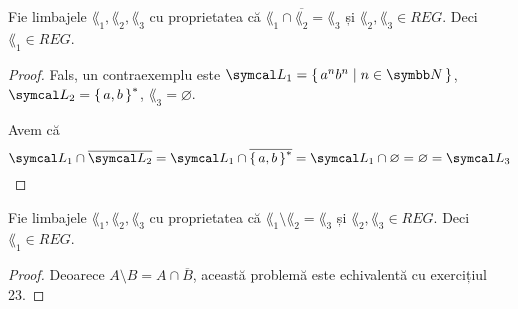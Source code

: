 \begin{exercise}
    Fie limbajele \(\lang_1, \lang_2, \lang_3\) cu proprietatea că \(\lang_1 \cap \overline{\lang_2} = \lang_3\) și \(\lang_2, \lang_3 \in REG\). Deci \(\lang_1 \in REG\).
\end{exercise}
\begin{proof}
    Fals, un contraexemplu este \(\lang_1 = \set{ a^n b^n | n \in \naturals }\), \(\lang_2 = \set{a, b}^*\), \(\lang_3 = \varnothing\).

    Avem că
    \[\lang_1 \cap \overline{\lang_2} = \lang_1 \cap \overline{\set{ a, b }^* } = \lang_1 \cap \varnothing = \varnothing = \lang_3\]
\end{proof}

\begin{exercise}
    Fie limbajele \(\lang_1, \lang_2, \lang_3\) cu proprietatea că \(\lang_1 \setminus \lang_2 = \lang_3\) și \(\lang_2, \lang_3 \in REG\). Deci \(\lang_1 \in REG\).
\end{exercise}
\begin{proof}
    Deoarece \(A \setminus B = A \cap \overline{B}\), această problemă este echivalentă cu exercițiul 23.
\end{proof}
